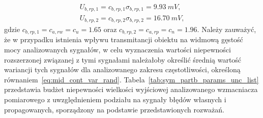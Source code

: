 \begin{gather}
U_{b,rp,1} = c_{b,rp,1} \sigma_{b,rp,1} = \qty{9.93}{mV} \label{eq:sym_partb_uncert_rand_prop_1}, \\
U_{b,rp,2} = c_{b,rp,2} \sigma_{b,rp,2} = \qty{16.70}{mV} \label{eq:sym_partb_uncert_rand_prop_2},
\end{gather}
gdzie $c_{b,rp,1} = c_{a,rw} = c_{u} = 1.65$ oraz $c_{b,rp,2} = c_{a,rp} = c_{n} = 1.96$. Należy zauważyć, że w przypadku istnienia wpływu transmitancji obiektu na widmową gęstość mocy analizowanych sygnałów, w celu wyznaczenia wartości niepewności rozszerzonej związanej z tymi sygnałami należałoby określić średnią wartość wariancji tych sygnałów dla analizowanego zakresu częstotliwości, określoną równaniem~\eqref{eq:mid_cont_var_rand}. Tabela~\ref{tab:sym_partb_params_unc_list} przedstawia budżet niepewności wielkości wyjściowej analizowanego wzmacniacza pomiarowego z uwzględnieniem podziału na sygnały błędów własnych i propagowanych, sporządzony na podstawie przedstawionych rozważań.


